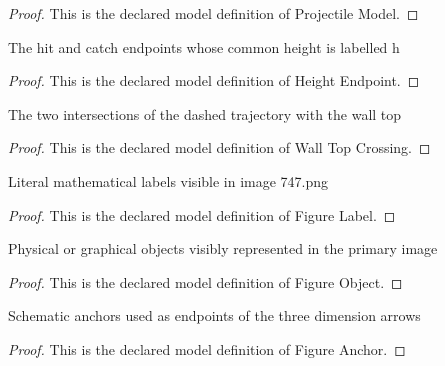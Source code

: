 \begin{proof}
  This is the declared model definition of Projectile Model.
\end{proof}
\begin{definition}
  \label{def:physics:phyx-mini-0747:phyxminiproblems-problemphyxmini0747-heightendpoint}
  The hit and catch endpoints whose common height is labelled h
\end{definition}
\begin{proof}
  This is the declared model definition of Height Endpoint.
\end{proof}
\begin{definition}
  \label{def:physics:phyx-mini-0747:phyxminiproblems-problemphyxmini0747-walltopcrossing}
  The two intersections of the dashed trajectory with the wall top
\end{definition}
\begin{proof}
  This is the declared model definition of Wall Top Crossing.
\end{proof}
\begin{definition}
  \label{def:physics:phyx-mini-0747:phyxminiproblems-problemphyxmini0747-figurelabel}
  Literal mathematical labels visible in image 747.png
\end{definition}
\begin{proof}
  This is the declared model definition of Figure Label.
\end{proof}
\begin{definition}
  \label{def:physics:phyx-mini-0747:phyxminiproblems-problemphyxmini0747-figureobject}
  Physical or graphical objects visibly represented in the primary image
\end{definition}
\begin{proof}
  This is the declared model definition of Figure Object.
\end{proof}
\begin{definition}
  \label{def:physics:phyx-mini-0747:phyxminiproblems-problemphyxmini0747-figureanchor}
  Schematic anchors used as endpoints of the three dimension arrows
\end{definition}
\begin{proof}
  This is the declared model definition of Figure Anchor.
\end{proof}
